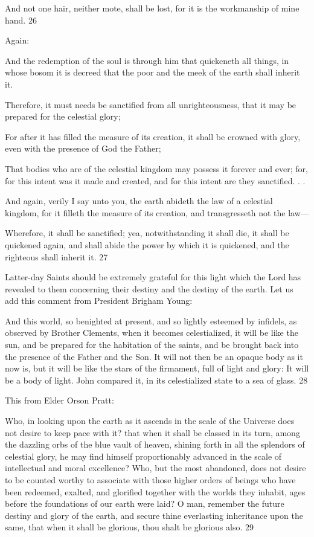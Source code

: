 And not one hair, neither mote, shall be lost, for it is the workmanship of mine hand. 26

Again:

And the redemption of the soul is through him that quickeneth all things, in whose bosom it
is decreed that the poor and the meek of the earth shall inherit it.

Therefore, it must needs be sanctified from all unrighteousness, that it may be prepared for
the celestial glory;

For after it has filled the measure of its creation, it shall be crowned with glory, even with the
presence of God the Father;

That bodies who are of the celestial kingdom may possess it forever and ever; for, for this
intent was it made and created, and for this intent are they sanctified. . .

And again, verily I say unto you, the earth abideth the law of a celestial kingdom, for it filleth
the measure of its creation, and transgresseth not the law—

Wherefore, it shall be sanctified; yea, notwithstanding it shall die, it shall be quickened again,
and shall abide the power by which it is quickened, and the righteous shall inherit it. 27

Latter-day Saints should be extremely grateful for this light which the Lord has revealed to
them concerning their destiny and the destiny of the earth. Let us add this comment from
President Brigham Young:

And this world, so benighted at present, and so lightly esteemed by infidels, as observed by
Brother Clements, when it becomes celestialized, it will be like the sun, and be prepared for
the habitation of the saints, and be brought back into the presence of the Father and the Son.
It will not then be an opaque body as it now is, but it will be like the stars of the firmament,
full of light and glory: It will be a body of light. John compared it, in its celestialized state to
a sea of glass. 28

This from Elder Orson Pratt:

Who, in looking upon the earth as it ascends in the scale of the Universe does not desire to
keep pace with it? that when it shall be classed in its turn, among the dazzling orbs of the
blue vault of heaven, shining forth in all the splendors of celestial glory, he may find himself
proportionably advanced in the scale of intellectual and moral excellence? Who, but the most
abandoned, does not desire to be counted worthy to associate with those higher orders of
beings who have been redeemed, exalted, and glorified together with the worlds they inhabit,
ages before the foundations of our earth were laid? O man, remember the future destiny and
glory of the earth, and secure thine everlasting inheritance upon the same, that when it shall
be glorious, thou shalt be glorious also. 29


